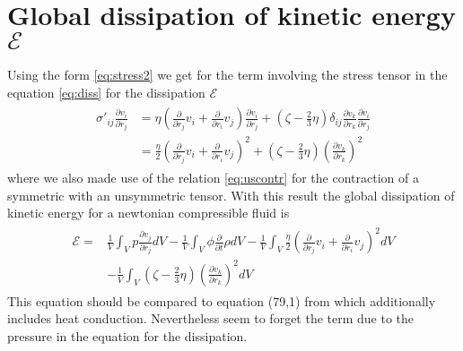 \documentclass[a4paper,
					fontsize=12pt,
					twoside,
					pagesize,
					cleardoublepage=plain,
					headsepline,
					bibliography=totoc
					]{scrbook}
\newcommand{\lra}[1]{{ \left( #1 \right) }}
\newcommand{\pd}[1]{\frac{\partial}{\partial #1}}
\newcommand{\ppd}[2]{\frac{\partial #2}{\partial #1}}
\begin{document}
\section{Global dissipation of kinetic energy $\mathcal{E}$}
Using the form \eqref{eq:stress2} we get for the term involving the stress
tensor in the equation \eqref{eq:diss} for the dissipation $\mathcal{E}$
\begin{align}
\begin{split}
\sigma'_{ij}\ppd{r_j}{v_i} 
&= \eta\lra{\pd{r_j}v_i+\pd{r_i}v_j}\ppd{r_j}{v_i}
+ \lra{\zeta-\frac{2}{3}\eta}\delta_{ij}\ppd{r_k}{v_k}\ppd{r_j}{v_i}\\
&=\frac{\eta}{2}\lra{\pd{r_j}v_i+\pd{r_i}v_j}^2
+\lra{\zeta-\frac{2}{3}\eta}\lra{\ppd{r_k}{v_k}}^2
\end{split}
\end{align}
where we also made use of the relation \eqref{eq:uscontr} for the contraction of
a symmetric with an unsymmetric tensor. With this result the global dissipation
of kinetic energy for a newtonian compressible fluid is
\begin{align}
\begin{split}
\mathcal{E} =& 
\frac{1}{V} \int_V p \ppd{r_j}{v_j} dV
-\frac{1}{V} \int_V \phi \pd{t}\rho dV
-\frac{1}{V} \int_V \frac{\eta}{2}\lra{\pd{r_j}v_i+\pd{r_i}v_j}^2 dV\\
&-\frac{1}{V} \int_V \lra{\zeta-\frac{2}{3}\eta}\lra{\ppd{r_k}{v_k}}^2 dV
\end{split}
\end{align}
This equation should be compared to equation (79,1) from \citet{Landau1991}
which additionally includes heat conduction. Nevertheless \citet{Landau1991}
seem to forget the term due to the pressure in the equation for the
dissipation.
\end{document}
